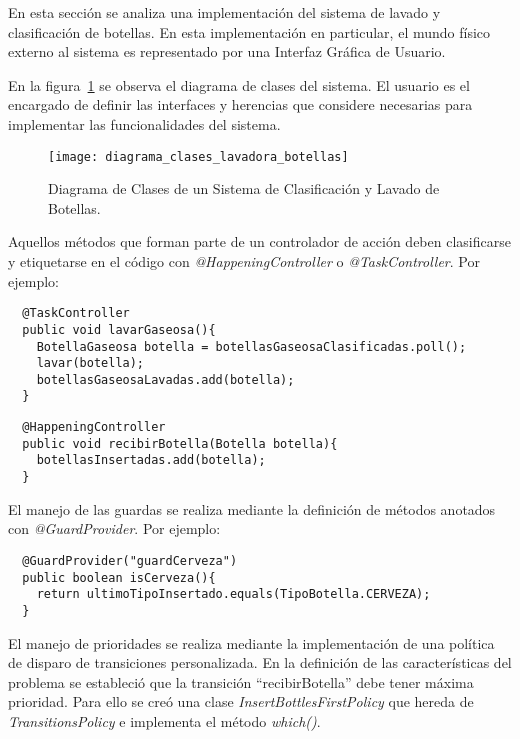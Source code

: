 En esta sección se analiza una implementación del sistema de
lavado y clasificación de botellas. En esta implementación en particular, el
mundo físico externo al sistema es representado por una Interfaz Gráfica de
Usuario. 

En la figura~\ref{fig:diagrama_clases_lavadora_botellas} se observa el diagrama
de clases del sistema. El usuario es el encargado de definir las interfaces y
herencias que considere necesarias para implementar las funcionalidades del
sistema.
\begin{figure}[H]
    \centering
    \texttt{[image: diagrama\_clases\_lavadora\_botellas]}
    \caption{Diagrama de Clases de un Sistema de Clasificación y Lavado de
    Botellas.}
    \label{fig:diagrama_clases_lavadora_botellas}
\end{figure}

Aquellos métodos que forman parte de un controlador de acción deben
clasificarse y etiquetarse en el código con \emph{@HappeningController} o
\emph{@TaskController}. Por ejemplo:\\

\begin{verbatim}
  @TaskController
  public void lavarGaseosa(){
    BotellaGaseosa botella = botellasGaseosaClasificadas.poll();
    lavar(botella);
    botellasGaseosaLavadas.add(botella);
  }
\end{verbatim}

\begin{verbatim}
  @HappeningController
  public void recibirBotella(Botella botella){
    botellasInsertadas.add(botella);
  }
\end{verbatim}

El manejo de las guardas se realiza mediante la definición de métodos anotados
con \emph{@GuardProvider}. Por ejemplo:\\

\begin{verbatim}
  @GuardProvider("guardCerveza")
  public boolean isCerveza(){
    return ultimoTipoInsertado.equals(TipoBotella.CERVEZA);
  }
\end{verbatim}

El manejo de prioridades se realiza mediante la implementación de una política
de disparo de transiciones personalizada. En la definición de las
características del problema se estableció que la transición ``recibirBotella''
debe tener máxima prioridad. Para ello se creó una clase
\emph{InsertBottlesFirstPolicy} que hereda de \emph{TransitionsPolicy} e
implementa el método \emph{which()}. 

